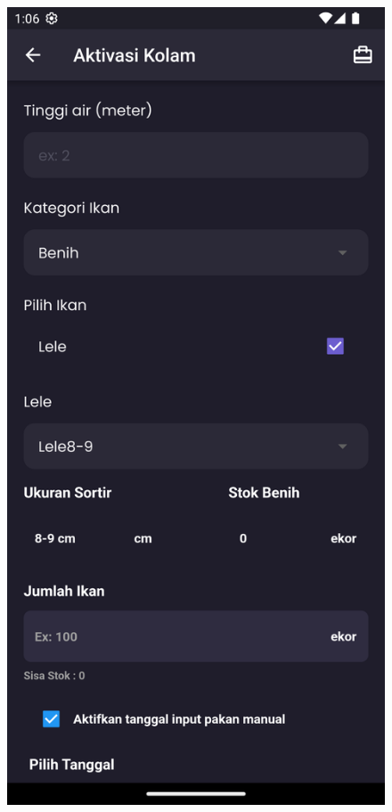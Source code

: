 \begin{spacing}{1.5}
\begin{enumerate}
		\begin{figure}[H]
				\includegraphics[width=\linewidth]{gambar/sprint4/aktivasi_1.png}

\end{figure}
\end{enumerate}
\end{spacing}
